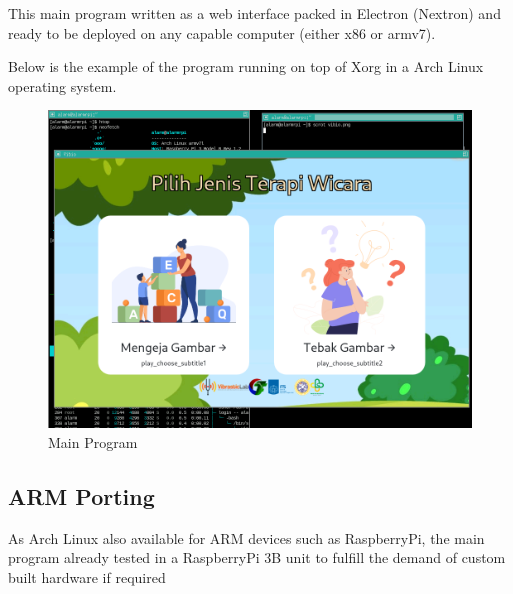 \documentclass{article} %
\begin{document}
	This main program written as a web interface packed in Electron (Nextron) and ready to be deployed on any capable computer (either x86 or armv7).
	
	Below is the example of the program running on top of Xorg in a Arch Linux operating system.
	
	\begin{figure}[!ht]                                  %
		\centering                                       %
		
		\includegraphics[width=350pt]{images/vibio}
		
		\caption{Main Program}                         %
	\end{figure}

	\subsection{ARM Porting}
	
	As Arch Linux also available for ARM devices such as RaspberryPi, the main program already tested in a RaspberryPi 3B unit
	to fulfill the demand of custom built hardware if required
	
\end{document}
